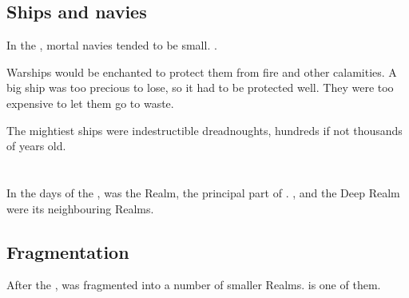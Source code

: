 \subsection{Ships and navies}
In the , mortal navies tended to be small. 
. 

Warships would be enchanted to protect them from fire and other calamities. 
A big ship was too precious to lose, so it had to be protected well. 
They were too expensive to let them go to waste. 

The mightiest ships were indestructible dreadnoughts, hundreds if not thousands of years old. 















\section{\Tembrae}
In the days of the \secondbanewar, \Tembrae{} was the  Realm, the principal part of \Miith{}. 
\Machai{}, \Nyx{} and the Deep Realm were its neighbouring Realms. 








\subsection{Fragmentation}
After the \SecondShrouding{}, \Tembrae{} was fragmented into a number of smaller Realms. 
\Azmith{} is one of them. 










